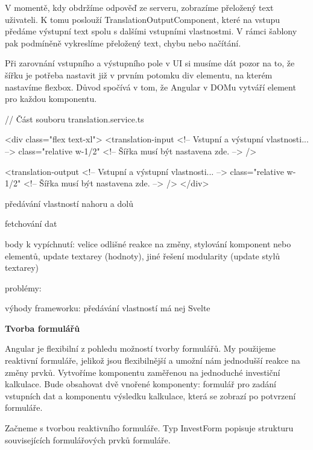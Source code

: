 V momentě, kdy obdržíme odpověď ze serveru, zobrazíme přeložený text uživateli. 
K tomu poslouží TranslationOutputComponent, které na vstupu předáme výstupní text spolu s dalšími vstupními vlastnostmi. 
V rámci šablony pak podmíněně vykreslíme přeložený text, chybu nebo načítání. 

Při zarovnání vstupního a výstupního pole v UI si musíme dát pozor na to, že šířku je potřeba nastavit již v prvním potomku div elementu, na kterém nastavíme flexbox. 
Důvod spočívá v tom, že Angular v DOMu vytváří element pro každou komponentu.

\begin{prog}
// Část souboru translation.service.ts

<div class="flex text-xl">
  <translation-input 
    <!-- Vstupní a výstupní vlastnosti... -->
    class="relative w-1/2"
    <!-- Šířka musí být nastavena zde. -->
  />

  <translation-output 
    <!-- Vstupní a výstupní vlastnosti... -->
    class="relative w-1/2"
    <!-- Šířka musí být nastavena zde. -->
  />
</div>
\end{prog}

\begin{citemize}
	\item předávání vlastností nahoru a dolů
	\item fetchování dat
	\item body k vypíchnutí: velice odlišné reakce na změny, stylování komponent nebo elementů, update textarey (hodnoty), jiné řešení modularity (update stylů textarey)
	\item problémy:
	\item výhody frameworku: předávání vlastností má nej Svelte
\end{citemize}

\begin{flushleft}
  \textbf{Tvorba formulářů}
\end{flushleft}

Angular je flexibilní z pohledu možností tvorby formulářů. My použijeme reaktivní formuláře, jelikož jsou flexibilnější a umožní nám jednodušší reakce na změny prvků.
Vytvoříme komponentu zaměřenou na jednoduché investiční kalkulace. 
Bude obsahovat dvě vnořené komponenty: formulář pro zadání vstupních dat a komponentu výsledku kalkulace, která se zobrazí po potvrzení formuláře.

Začneme s tvorbou reaktivního formuláře. Typ InvestForm popisuje strukturu souvisejících formulářových prvků formuláře.

